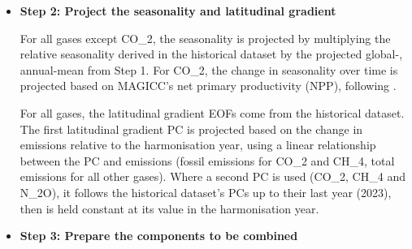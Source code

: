 \begin{itemize}
{        We use the single concentration projection route where such a projection is available,
        the one-box route based on expert judgement about the impact of lifetime feedbacks
        and the impact of updating MAGICC's lifetimes
        (an imperfect, but pragmatic, choice which only affects gases with relatively small radiative forcing,
        see Sect.~\ref{sec:discussion})
        and MAGICC otherwise.
    }

    \item {
        \textbf{Step 2: Project the seasonality and latitudinal gradient}

        For all gases except CO_2,
        the seasonality is projected by multiplying the relative seasonality derived in the historical dataset
        by the projected global-, annual-mean from Step 1.
        For CO_2, the change in seasonality over time is projected based on MAGICC's net primary productivity (NPP),
        following \citet{meinshausen_ssp-ghgs_2020}.

        For all gases, the latitudinal gradient EOFs come from the historical dataset.
        The first latitudinal gradient PC is projected based on the change in emissions relative to the harmonisation year,
        using a linear relationship between the PC and emissions
        (fossil emissions for CO_2 and CH_4, total emissions for all other gases).
        Where a second PC is used (CO_2, CH_4 and N_2O), it follows the historical dataset's PCs up to their last year (2023),
        then is held constant at its value in the harmonisation year.
    }

    \item {
        \textbf{Step 3: Prepare the components to be combined}

}
\end{itemize}
